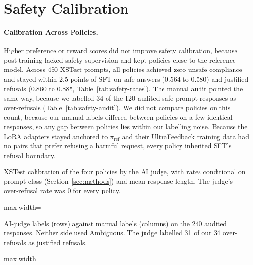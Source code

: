 \documentclass{article}
\newcommand{\tablebody}[1]{\small\setlength{\tabcolsep}{4pt}\begin{adjustbox}{max width=\linewidth}\end{adjustbox}}
\begin{document}
\section{Safety Calibration}
\label{sec:safety}

\paragraph{Calibration Across Policies.} Higher preference or reward scores did not improve safety calibration, because post-training lacked safety supervision and kept policies close to the reference model. Across 450 XSTest prompts, all policies achieved zero unsafe compliance and stayed within 2.5 points of SFT on safe answers (0.564 to 0.580) and justified refusals (0.860 to 0.885, Table~\ref{tab:safety-rates}). The manual audit pointed the same way, because we labelled 34 of the 120 audited safe-prompt responses as over-refusals (Table~\ref{tab:safety-audit}). We did not compare policies on this count, because our manual labels differed between policies on a few identical responses, so any gap between policies lies within our labelling noise. Because the LoRA adapters stayed anchored to $\pi_{\text{ref}}$ and their UltraFeedback training data had no pairs that prefer refusing a harmful request, every policy inherited SFT's refusal boundary.

\begin{table}[!htb]
  \centering
  \caption{XSTest calibration of the four policies by the AI judge, with rates conditional on prompt class (Section~\ref{sec:methods}) and mean response length. The judge's over-refusal rate was 0 for every policy.}
  \label{tab:safety-rates}
  \tablebody{tables/t4_rates.tex}
\end{table}

\begin{table}[!htb]
  \centering
  \caption{AI-judge labels (rows) against manual labels (columns) on the 240 audited responses. Neither side used Ambiguous. The judge labelled 31 of our 34 over-refusals as justified refusals.}
  \label{tab:safety-audit}
  \tablebody{tables/t4_confusion.tex}
\end{table}
\end{document}
